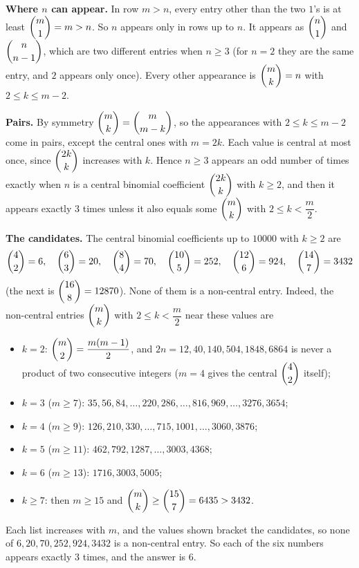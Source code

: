 \textbf{Where $n$ can appear.} In row $m>n$, every entry other than the two $1$'s is at least $\dbinom m1=m>n$. So $n$ appears only in rows up to $n$. It appears as $\dbinom n1$ and $\dbinom n{n-1}$, which are two different entries when $n\ge3$ (for $n=2$ they are the same entry, and $2$ appears only once). Every other appearance is $\dbinom mk=n$ with $2\le k\le m-2$.

\textbf{Pairs.} By symmetry $\dbinom mk=\dbinom m{m-k}$, so the appearances with $2\le k\le m-2$ come in pairs, except the central ones with $m=2k$. Each value is central at most once, since $\dbinom{2k}{k}$ increases with $k$. Hence $n\ge3$ appears an odd number of times exactly when $n$ is a central binomial coefficient $\dbinom{2k}{k}$ with $k\ge2$, and then it appears exactly $3$ times unless it also equals some $\dbinom mk$ with $2\le k<\dfrac {m}{2}$.

\textbf{The candidates.} The central binomial coefficients up to $10000$ with $k\ge2$ are
\[\dbinom42=6,\quad\dbinom63=20,\quad\dbinom84=70,\quad\dbinom{10}5=252,\quad\dbinom{12}6=924,\quad\dbinom{14}7=3432\]
(the next is $\dbinom{16}{8}=12870$). None of them is a non-central entry. Indeed, the non-central entries $\dbinom mk$ with $2\le k<\dfrac {m}{2}$ near these values are
\begin{itemize}
\item $k=2$: $\dbinom m2=\dfrac{m(m-1)}{2}$, and $2n=12,40,140,504,1848,6864$ is never a product of two consecutive integers ($m=4$ gives the central $\dbinom42$ itself);
\item $k=3$ ($m\ge7$): $35,56,84,\dots,220,286,\dots,816,969,\dots,3276,3654$;
\item $k=4$ ($m\ge9$): $126,210,330,\dots,715,1001,\dots,3060,3876$;
\item $k=5$ ($m\ge11$): $462,792,1287,\dots,3003,4368$;
\item $k=6$ ($m\ge13$): $1716,3003,5005$;
\item $k\ge7$: then $m\ge15$ and $\dbinom mk\ge\dbinom{15}{7}=6435>3432$.
\end{itemize}
Each list increases with $m$, and the values shown bracket the candidates, so none of $6,20,70,252,924,3432$ is a non-central entry. So each of the six numbers appears exactly $3$ times, and the answer is $\boxed{6}$.

